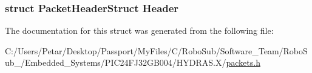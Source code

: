 \subsubsection[{Header}]{\setlength{\rightskip}{0pt plus 5cm}struct {\bf Packet\+Header\+Struct} Header}\label{struct_packet_hydrophones_get_struct_ab201af50281aff5ed4f984f994938007}


The documentation for this struct was generated from the following file\+:\begin{DoxyCompactItemize}
\item 
C\+:/\+Users/\+Petar/\+Desktop/\+Passport/\+My\+Files/\+C/\+Robo\+Sub/\+Software\+\_\+\+Team/\+Robo\+Sub\+\_/\+Embedded\+\_\+\+Systems/\+P\+I\+C24\+F\+J32\+G\+B004/\+H\+Y\+D\+R\+A\+S.\+X/\hyperlink{_h_y_d_r_a_s_8_x_2packets_8h}{packets.\+h}\end{DoxyCompactItemize}
